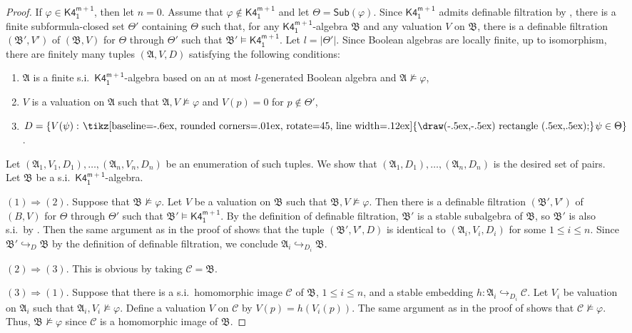\documentclass[a4paper,11pt]{article}
\theoremstyle{definition}
\theoremstyle{remark}
\numberwithin{theorem}{section}
\newcommand{\alg}[1]{\mathfrak{#1}}
\newcommand{\A}{\alg{A}}
\newcommand{\B}{\alg{B}}
\newcommand{\class}[1]{\mathcal{#1}}
\newcommand{\C}{\class{C}}
\newcommand{\logic}[1]{\mathsf{#1}}
\newcommand{\Kff}[2]{\logic{K4^{#1}_{#2}}}
\newcommand{\Sub}{\mathsf{Sub}}
\renewcommand{\phi}{\varphi}
\newcommand{\gooddiamond}{\hspace{.2ex}\text{%
  \tikz[baseline=-.6ex, rounded corners=.01ex, rotate=45, line width=.12ex]
    {\draw(-.5ex,-.5ex) rectangle (.5ex,.5ex);}}\kern.2ex}
\renewcommand{\Diamond}{\gooddiamond}
\newcommand{\Dia}{\Diamond}
\newcommand{\inj}{\hookrightarrow}
\begin{document}
\begin{proof}
    If $\phi \in \Kff{m+1}{1}$, then let $n=0$. Assume that $\phi \notin \Kff{m+1}{1}$ and let $\Theta = \Sub(\phi)$. Since $\Kff{m+1}{1}$ admits definable filtration by , there is a finite subformula-closed set $\Theta'$ containing $\Theta$ such that, for any $\Kff{m+1}{1}$-algebra $\B$ and any valuation $V$ on $\B$, there is a definable filtration $(\B', V')$ of $(\B, V)$ for $\Theta$ through $\Theta'$ such that $\B' \models \Kff{m+1}{1}$. Let $l = |\Theta'|$. Since Boolean algebras are locally finite, up to isomorphism, there are finitely many tuples $(\A, V, D)$ satisfying the following conditions:
    \begin{enumerate}
        \item $\A$ is a finite s.i.~$\Kff{m+1}{1}$-algebra based on an at most $l$-generated Boolean algebra and $\A \not\models \phi$,
        \item $V$ is a valuation on $\A$ such that $\A, V \not\models \phi$ and $V(p) = 0$ for $p \notin \Theta'$,
        \item $D = \{V(\psi): \Dia\psi \in \Theta\}$.
    \end{enumerate}
    Let $(\A_1, V_1, D_1), \dots, (\A_n, V_n, D_n)$ be an enumeration of such tuples. We show that $(\A_1, D_1), \dots, (\A_n, D_n)$ is the desired set of pairs. Let $\B$ be a s.i.~$\Kff{m+1}{1}$-algebra. 

    $(1) \Rightarrow (2)$. Suppose that $\B \not\models \phi$. Let $V$ be a valuation on $\B$ such that $\B, V \not\models \phi$. Then there is a definable filtration $(\B', V')$ of $(B, V)$ for $\Theta$ through $\Theta'$ such that $\B' \models \Kff{m+1}{1}$. By the definition of definable filtration, $\B'$ is a stable subalgebra of $\B$, so $\B'$ is also s.i.~by . Then the same argument as in the proof of  shows that the tuple $(\B', V', D)$ is identical to $(\A_i, V_i, D_i)$ for some $1 \leq i \leq n$. Since $\B' \inj_D \B$ by the definition of definable filtration, we conclude $\A_i \inj_{D_i} \B$.

    $(2) \Rightarrow (3)$. This is obvious by taking $\C = \B$.

    $(3) \Rightarrow (1)$. Suppose that there is a s.i.~homomorphic image $\C$ of $\B$, $1 \leq i \leq n$, and a stable embedding $h: \A_i \inj_{D_i} \C$. Let $V_i$ be valuation on $\A_i$ such that $\A_i, V_i \not\models \phi$. Define a valuation $V$ on $\C$ by $V(p) = h(V_i(p))$. The same argument as in the proof of  shows that $\C \not\models \phi$. Thus, $\B \not\models \phi$ since $\C$ is a homomorphic image of $\B$. 
    
\end{proof}
\end{document}
